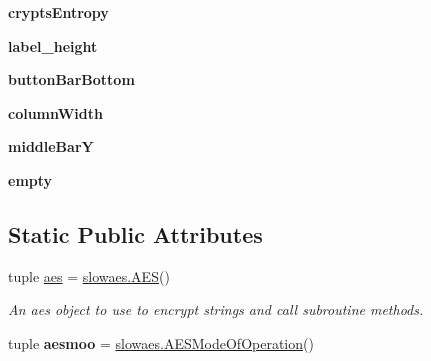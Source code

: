 \begin{DoxyCompactItemize}
\item 
\hypertarget{classsimplegui_1_1_main_scene_a021b0c1cb13db8497dba560911986ed4}{{\bfseries crypts\-Entropy}}\label{classsimplegui_1_1_main_scene_a021b0c1cb13db8497dba560911986ed4}

\item 
\hypertarget{classsimplegui_1_1_main_scene_a2a749ea3c4e4aace671f83ea68b16d25}{{\bfseries label\-\_\-height}}\label{classsimplegui_1_1_main_scene_a2a749ea3c4e4aace671f83ea68b16d25}

\item 
\hypertarget{classsimplegui_1_1_main_scene_af672fec772fc90129f8e5ba92f82ad5d}{{\bfseries button\-Bar\-Bottom}}\label{classsimplegui_1_1_main_scene_af672fec772fc90129f8e5ba92f82ad5d}

\item 
\hypertarget{classsimplegui_1_1_main_scene_ae86b310e4226fc8a1b93b8563841e9c7}{{\bfseries column\-Width}}\label{classsimplegui_1_1_main_scene_ae86b310e4226fc8a1b93b8563841e9c7}

\item 
\hypertarget{classsimplegui_1_1_main_scene_ab1659015b41aa39ee60c3275452953fe}{{\bfseries middle\-Bar\-Y}}\label{classsimplegui_1_1_main_scene_ab1659015b41aa39ee60c3275452953fe}

\item 
\hypertarget{classsimplegui_1_1_main_scene_a77e225283588bdbaa435c00b268dc5ae}{{\bfseries empty}}\label{classsimplegui_1_1_main_scene_a77e225283588bdbaa435c00b268dc5ae}

\end{DoxyCompactItemize}
\subsection*{Static Public Attributes}
\begin{DoxyCompactItemize}
\item 
tuple \hyperlink{classsimplegui_1_1_main_scene_afc11de68b1f5e44d5831ca15698bbd69}{aes} = \hyperlink{classslowaes_1_1_a_e_s}{slowaes.\-A\-E\-S}()
\begin{DoxyCompactList}\small\item\em An aes object to use to encrypt strings and call subroutine methods. \end{DoxyCompactList}\item 
\hypertarget{classsimplegui_1_1_main_scene_afdac18342ee21e270adcd32168b2392a}{tuple {\bfseries aesmoo} = \hyperlink{classslowaes_1_1_a_e_s_mode_of_operation}{slowaes.\-A\-E\-S\-Mode\-Of\-Operation}()}\label{classsimplegui_1_1_main_scene_afdac18342ee21e270adcd32168b2392a}

\end{DoxyCompactItemize}


